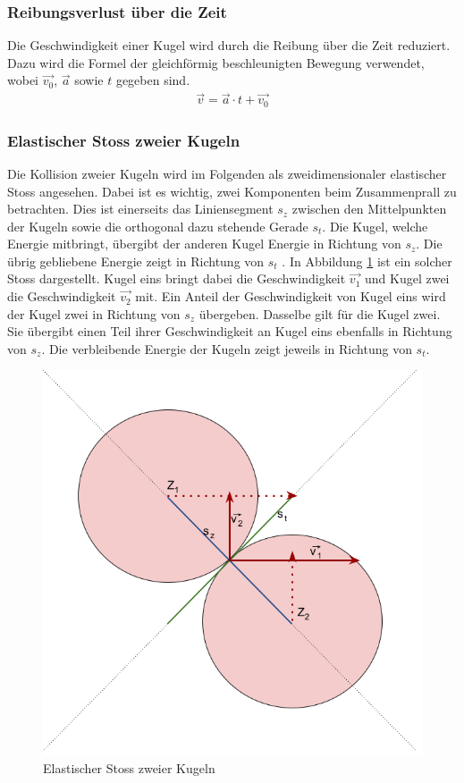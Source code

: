 \subsubsection{Reibungsverlust über die Zeit}
Die Geschwindigkeit einer Kugel wird durch die Reibung über die Zeit reduziert. Dazu wird die Formel der gleichförmig
beschleunigten Bewegung verwendet, wobei $\vec{v_0}$, $\vec{a}$ sowie $t$ gegeben sind.
\begin{align}
    \vec{v} = \vec{a} \cdot t + \vec{v_0}
\end{align}

\subsubsection{Elastischer Stoss zweier Kugeln}\label{kap:simulation:elastischer_stoss_zweier_kugeln}
Die Kollision zweier Kugeln wird im Folgenden als zweidimensionaler elastischer Stoss angesehen. Dabei ist es wichtig,
zwei Komponenten beim Zusammenprall zu betrachten. Dies ist einerseits das Liniensegment $s_z$ zwischen den Mittelpunkten
der Kugeln sowie die orthogonal dazu stehende Gerade $s_t$. Die Kugel, welche Energie mitbringt, übergibt der anderen
Kugel Energie in Richtung von $s_z$. Die übrig gebliebene Energie zeigt in Richtung von $s_t$ \cite{wiki.elastischer_stoss_physik:1}.
In Abbildung \ref{fig:Elastischer Stoss zweier Kugeln} ist ein solcher Stoss dargestellt.
Kugel eins bringt dabei die Geschwindigkeit $\vec{v_1}$ und Kugel zwei die Geschwindigkeit $\vec{v_2}$ mit. Ein Anteil
der Geschwindigkeit von Kugel eins wird der Kugel zwei in Richtung von $s_z$ übergeben. Dasselbe gilt für die
Kugel zwei. Sie übergibt einen Teil ihrer Geschwindigkeit an Kugel eins ebenfalls in Richtung von $s_z$. Die verbleibende
Energie der Kugeln zeigt jeweils in Richtung von $s_t$.
\begin{figure}[h!]
    \begin{center}
        \includegraphics[width=0.4\linewidth]{../common/03_billiard_ai/resources/23_elastischer_stoss.png}
    \end{center}
    \caption{Elastischer Stoss zweier Kugeln}
    \label{fig:Elastischer Stoss zweier Kugeln}
\end{figure}

